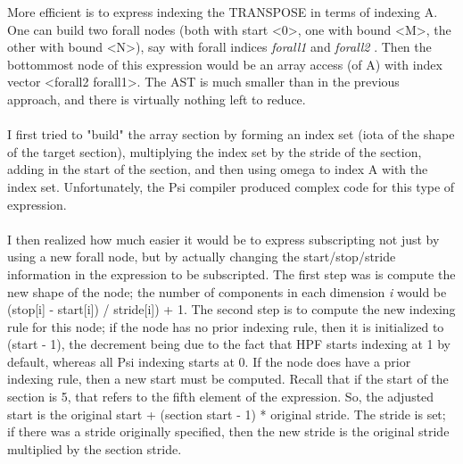   More efficient is to express indexing the TRANSPOSE in terms of indexing A.
  One can build two forall nodes (both with start <0>, one with bound <M>, the
  other with bound <N>), say with forall indices {\em forall1 }  and
  {\em forall2 } .  Then the bottommost node of this expression would
  be an array access (of A) with index vector <forall2 forall1>.  The AST
  is much smaller than in the previous approach, and there is virtually
  nothing left to reduce.\\ \\

  I first tried to "build" the array section by forming an index set
  (iota of the shape of the target section), multiplying the index set
  by the stride of the section, adding in the start of the section, and
  then using omega to index A with the index set.  Unfortunately, the Psi
  compiler produced complex code for this type of expression.\\ \\

  I then realized how much easier it would be to express subscripting
  not just by using a new forall node, but by actually changing the
  start/stop/stride information in the expression to be subscripted.
  The first step was is compute the new shape of the node; the number of
  components in each dimension {\em i }  would be (stop[i] - start[i])
  / stride[i]) + 1.  The second step is to compute the new indexing
  rule for this node; if the node has no prior indexing rule, then it
  is initialized to (start - 1), the decrement being due to the fact that
  HPF starts indexing at 1 by default, whereas all Psi indexing starts at 0.
  If the node does have a prior indexing rule, 
  then a new start must be computed.  Recall that if the start of the
  section is 5, that refers to the fifth element of the expression.  So,
  the adjusted start is the original start + (section start - 1) * original
  stride.
  The stride is set; if there was a stride originally specified, then the
  new stride is the original stride multiplied by the section stride.\\ \\

